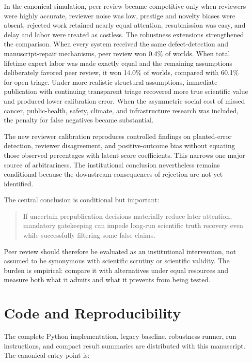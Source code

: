 \documentclass[11pt]{article}
\begin{document}
In the canonical simulation, peer review became competitive only when reviewers were highly accurate, reviewer noise was low, prestige and novelty biases were absent, rejected work retained nearly equal attention, resubmission was easy, and delay and labor were treated as costless. The robustness extensions strengthened the comparison. When every system received the same defect-detection and manuscript-repair mechanisms, peer review won 0.4\% of worlds. When total lifetime expert labor was made exactly equal and the remaining assumptions deliberately favored peer review, it won 14.0\% of worlds, compared with 60.1\% for open triage. Under more realistic structural assumptions, immediate publication with continuing transparent triage recovered more true scientific value and produced lower calibration error. When the asymmetric social cost of missed cancer, public-health, safety, climate, and infrastructure research was included, the penalty for false negatives became substantial.

The new reviewer calibration reproduces controlled findings on planted-error detection, reviewer disagreement, and positive-outcome bias without equating those observed percentages with latent score coefficients. This narrows one major source of arbitrariness. The institutional conclusion nevertheless remains conditional because the downstream consequences of rejection are not yet identified.

The central conclusion is conditional but important:

\begin{quote}
If uncertain prepublication decisions materially reduce later attention, mandatory gatekeeping can impede long-run scientific truth recovery even while successfully filtering some false claims.
\end{quote}

Peer review should therefore be evaluated as an institutional intervention, not assumed to be synonymous with scientific scrutiny or scientific validity. The burden is empirical: compare it with alternatives under equal resources and measure both what it admits and what it prevents from being tested.

\section*{Code and Reproducibility}

The complete Python implementation, legacy baseline, robustness runner, run instructions, and compact result summaries are distributed with this manuscript. The canonical entry point is:
\end{document}
